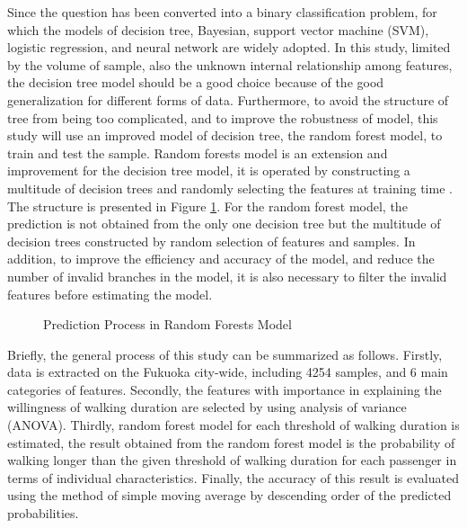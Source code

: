 \documentclass[sustainability,article,submit,moreauthors,pdftex,10pt,a4paper]{Definitions/mdpi}
\begin{document}
%
Since the question has been converted into a binary classification problem, for which the models of decision tree, Bayesian, support vector machine (SVM), logistic regression, and neural network are widely adopted. In this study, limited by the volume of sample, also the unknown internal relationship among features, the decision tree model should be a good choice because of the good generalization for different forms of data. Furthermore, to avoid the structure of tree from being too complicated, and to improve the robustness of model, this study will use an improved model of decision tree, the random forest model, to train and test the sample. Random forests model is an extension and improvement for the decision tree model, it is operated by constructing a multitude of decision trees and randomly selecting the features at training time \cite{ho1995random,ho1998random}. The structure is presented in Figure \ref{fig:RandomForests}. For the random forest model, the prediction is not obtained from the only one decision tree but the multitude of decision trees constructed by random selection of features and samples. In addition, to improve the efficiency and accuracy of the model, and reduce the number of invalid branches in the model, it is also necessary to filter the invalid features before estimating the model.

%
\begin{figure}[h]
	\caption{Prediction Process in Random Forests Model}
	\label{fig:RandomForests}
	\centering
\end{figure}

%
Briefly, the general process of this study can be summarized as follows. Firstly, data is extracted on the Fukuoka city-wide, including 4254 samples, and 6 main categories of features. Secondly, the features with importance in explaining the willingness of walking duration are selected by using analysis of variance (ANOVA). Thirdly, random forest model for each threshold of walking duration is estimated, the result obtained from the random forest model is the probability of walking longer than the given threshold of walking duration for each passenger in terms of individual characteristics. Finally, the accuracy of this result is evaluated using the method of simple moving average by descending order of the predicted probabilities.
\end{document}
